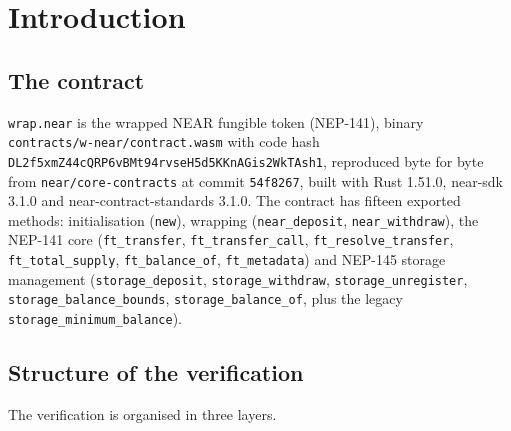 




\chapter{Introduction}

\section{The contract}

\texttt{wrap.near} is the wrapped NEAR fungible token (NEP-141), binary
\texttt{contracts/w-near/contract.wasm} with code hash
\texttt{DL2f5xmZ44cQRP6vBMt94rvseH5d5KKnAGis2WkTAsh1}, reproduced byte for
byte from \texttt{near/core-contracts} at commit \texttt{54f8267}, built with
Rust 1.51.0, near-sdk 3.1.0 and near-contract-standards 3.1.0. The contract
has fifteen exported methods: initialisation (\texttt{new}), wrapping
(\texttt{near\_deposit}, \texttt{near\_withdraw}), the NEP-141 core
(\texttt{ft\_transfer}, \texttt{ft\_transfer\_call},
\texttt{ft\_resolve\_transfer}, \texttt{ft\_total\_supply},
\texttt{ft\_balance\_of}, \texttt{ft\_metadata}) and NEP-145 storage
management (\texttt{storage\_deposit}, \texttt{storage\_withdraw},
\texttt{storage\_unregister}, \texttt{storage\_balance\_bounds},
\texttt{storage\_balance\_of}, plus the legacy
\texttt{storage\_minimum\_balance}).

\section{Structure of the verification}

The verification is organised in three layers.


